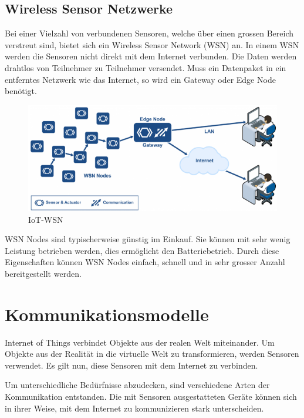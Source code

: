 \subsection{Wireless Sensor Netzwerke}
Bei einer Vielzahl von verbundenen Sensoren, welche über einen grossen Bereich verstreut sind, bietet sich ein Wireless Sensor Network (WSN) an. In einem WSN werden die Sensoren nicht direkt mit dem Internet verbunden. Die Daten werden drahtlos von Teilnehmer zu Teilnehmer versendet. Muss ein Datenpaket in ein entferntes Netzwerk wie das Internet, so wird ein Gateway oder Edge Node benötigt.
\begin{figure}[H]
\centering
\includegraphics[scale=0.8]{../02_Analyse/images/iot_wsn_lan_overview_by_micrium.png}
\caption{IoT-WSN\cite{IoTWSN}}
\end{figure}
WSN Nodes sind typischerweise günstig im Einkauf. Sie können mit sehr wenig Leistung betrieben werden, dies ermöglicht den Batteriebetrieb. Durch diese Eigenschaften können WSN Nodes einfach, schnell und in sehr grosser Anzahl bereitgestellt werden. 

\section{Kommunikationsmodelle}
Internet of Things verbindet Objekte aus der realen Welt miteinander. Um Objekte aus der Realität in die virtuelle Welt zu transformieren, werden Sensoren verwendet. Es gilt nun, diese Sensoren mit dem Internet zu verbinden.

Um unterschiedliche Bedürfnisse abzudecken, sind verschiedene Arten der Kommunikation entstanden. Die mit Sensoren ausgestatteten Geräte können sich in ihrer Weise, mit dem Internet zu kommunizieren stark unterscheiden.

